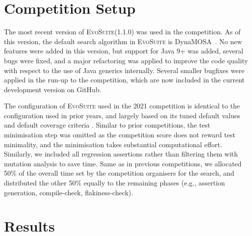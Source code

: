 \documentclass[10pt,conference]{IEEEtran}
\newcommand{\EVOSUITE}{\textsc{EvoSuite}\xspace}
\begin{document}





\section{Competition Setup}


The most recent version of \EVOSUITE (1.1.0) was used in the competition. As of
this version, the default search algorithm in \EVOSUITE is
DynaMOSA~\cite{dynamosa}. No new features were added in this version, but
support for Java 9+ was added, several bugs were fixed, and a major refactoring
was applied to improve the code quality with respect to the use of Java
generics internally. Several smaller bugfixes were applied in the run-up to the
competition, which are now included in the current development version on
GitHub.

The configuration of \EVOSUITE used in the 2021 competition is identical to the
configuration used in prior years, and largely based on its tuned default
values~\cite{arcuri2013parameter} and default coverage criteria
\cite{rojas2015combining}.
%
Similar to prior competitions, the test minimisation step was omitted as the competition score does not reward test minimality, and the minimisation takes substantial computational effort. Similarly, we included all regression assertions rather than filtering them with mutation analysis to save time. 
%
Same as in previous competitions, we allocated 50\% of
the overall time set by the competition organisers for the search, and
distributed the other 50\% equally to the remaining phases (e.g., assertion generation, compile-check, flakiness-check).



\section{Results}
\end{document}
